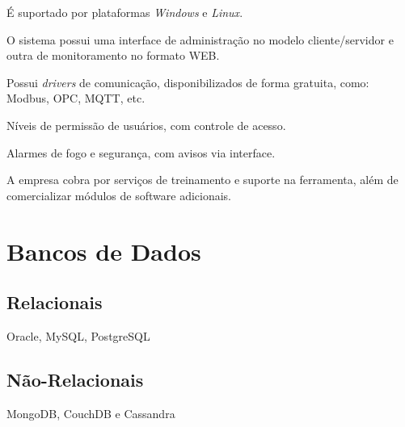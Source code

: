 	    \begin{alineascomponto}
	        \item É suportado por plataformas \textit{Windows} e \textit{Linux}.
    	    \item O sistema possui uma interface de administração no modelo cliente/servidor e outra de monitoramento no formato \gls{WEB}.
    	    \item Possui \textit{drivers} de comunicação, disponibilizados de forma gratuita, como: Modbus, \gls{OPC}, \gls{MQTT}, etc.
    	    \item Níveis de permissão de usuários, com controle de acesso.
    	    \item Alarmes de fogo e segurança, com avisos via interface.
    	    \item A empresa cobra por serviços de treinamento e suporte na ferramenta, além de comercializar módulos de software adicionais.
        \end{alineascomponto}
	    
    \section{Bancos de Dados}
    \label{sec:bancos-de-dados}
    
        \subsection{Relacionais}
        \label{sec:bancos-de-dados-relacionais}
            Oracle, MySQL, PostgreSQL
        
        \subsection{Não-Relacionais}
        \label{sec:bancos-de-dados-relacionais}
        \cite{cattell2011scalable}
        
            MongoDB, CouchDB e Cassandra